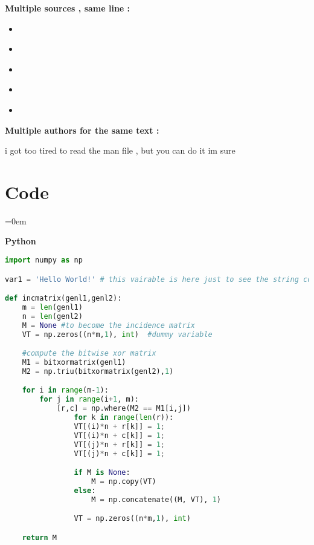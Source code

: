 
\textbf{Multiple sources , same line :}



\begin{itemize}[noitemsep]

	\item \cite{einstein,lipsum}
	\item \citet{einstein,lipsum}
	\item \citep{einstein,lipsum}
	\item \citet*{einstein,lipsum}
	\item \citep*{einstein,lipsum}

\end{itemize}



\textbf{Multiple authors for the same text :}

i got too tired to read the man file , but you can do it im sure

\subsubsectionend


\sectionend

\section{Code}
\label{sec:code}
\parindent=0em

\textbf{Python}
\begin{lstlisting}[language=Python]
import numpy as np

var1 = 'Hello World!' # this vairable is here just to see the string color

def incmatrix(genl1,genl2):
	m = len(genl1)
	n = len(genl2)
	M = None #to become the incidence matrix
	VT = np.zeros((n*m,1), int)  #dummy variable

	#compute the bitwise xor matrix
	M1 = bitxormatrix(genl1)
	M2 = np.triu(bitxormatrix(genl2),1) 

	for i in range(m-1):
		for j in range(i+1, m):
			[r,c] = np.where(M2 == M1[i,j])
				for k in range(len(r)):
				VT[(i)*n + r[k]] = 1;
				VT[(i)*n + c[k]] = 1;
				VT[(j)*n + r[k]] = 1;
				VT[(j)*n + c[k]] = 1;

				if M is None:
					M = np.copy(VT)
				else:
					M = np.concatenate((M, VT), 1)

				VT = np.zeros((n*m,1), int)

	return M
\end{lstlisting}

